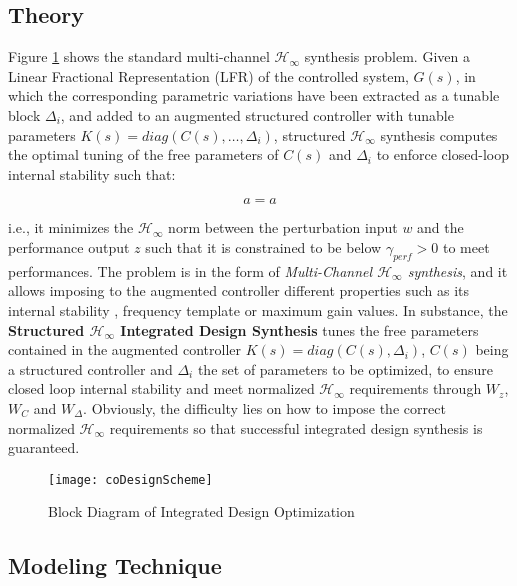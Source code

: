 \documentclass{ifacconf}
\begin{document}
\subsection{Theory}
\label{subsec:hinf}
Figure \ref{fig:coDesignScheme} shows the standard multi-channel $\mathcal{H}_\infty$ synthesis problem. Given a Linear Fractional Representation (LFR) of the controlled system, $G(s)$, in which the corresponding parametric variations have been extracted as a tunable block $\Delta_i$, and added to an augmented structured controller with tunable parameters $K(s)= diag(C(s),\ldots,\Delta_i)$, structured $\mathcal{H}_\infty$ synthesis computes the optimal tuning of the free parameters of $C(s)$ and $\Delta_i$ to enforce closed-loop internal stability such that:

\begin{equation}
\label{eq:hinf}
a=a
\end{equation}


i.e., it minimizes the $\mathcal{H}_\infty$ norm between the perturbation input $w$ and the performance output $z$ such that it is constrained to be below $\gamma_{perf}>0$ to meet performances. The problem is in the form of \emph{Multi-Channel $\mathcal{H}_\infty$ synthesis}, and it allows imposing to the augmented controller different properties such as its internal stability \citep{Alazard2013_ID}, frequency template \citep{Loquen2012_Hinf} or maximum gain values. In substance, the \textbf{Structured $\mathcal{H}_\infty$ Integrated Design Synthesis} tunes the free parameters contained in the augmented controller $K(s) = diag(C(s),\Delta_i)$, $C(s)$ being a structured controller and $\Delta_i$ the set of parameters to be optimized, to ensure closed loop internal stability and meet normalized $\mathcal{H}_\infty$ requirements through $W_z$, $W_C$ and $W_\Delta$. Obviously, the difficulty lies on how to impose the correct normalized $\mathcal{H}_\infty$ requirements so that successful integrated design synthesis is guaranteed.   

\begin{figure} 
\centering
\texttt{[image: coDesignScheme]}
\caption{Block Diagram of Integrated Design Optimization}
\label{fig:coDesignScheme}
\end{figure}

\subsection{Modeling Technique}
\label{subsec:modelingTechnique}
\end{document}
